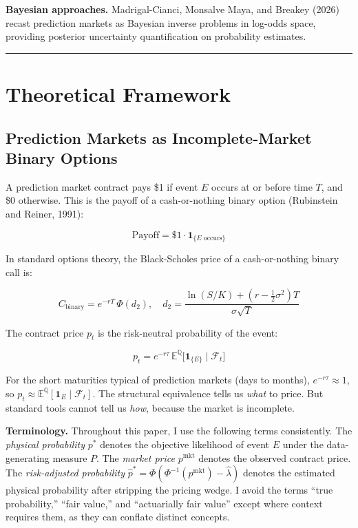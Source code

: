 \documentclass[12pt,a4paper]{article}
\begin{document}
\textbf{Bayesian approaches.} Madrigal-Cianci, Monsalve Maya, and
Breakey (2026) recast prediction markets as Bayesian inverse problems in
log-odds space, providing posterior uncertainty quantification on
probability estimates.

\begin{center}\rule{0.5\linewidth}{0.5pt}\end{center}

\section{Theoretical Framework}\label{theoretical-framework}

\subsection{Prediction Markets as Incomplete-Market Binary
Options}\label{prediction-markets-as-incomplete-market-binary-options}

A prediction market contract pays \$1 if event \(E\) occurs at or before
time \(T\), and \$0 otherwise. This is the payoff of a cash-or-nothing
binary option (Rubinstein and Reiner, 1991):

\[\text{Payoff} = \$1 \cdot \mathbf{1}_{\{E \text{ occurs}\}}\]

In standard options theory, the Black-Scholes price of a cash-or-nothing
binary call is:

\[C_{\text{binary}} = e^{-rT}\,\Phi(d_2), \quad d_2 = \frac{\ln(S/K) + (r - \tfrac{1}{2}\sigma^2)T}{\sigma\sqrt{T}}\]

The contract price \(p_t\) is the risk-neutral probability of the event:

\[p_t = e^{-r\tau}\,\mathbb{E}^{\mathbb{Q}}\!\big[\mathbf{1}_{\{E\}} \mid \mathcal{F}_t\big]\]

For the short maturities typical of prediction markets (days to months),
\(e^{-r\tau} \approx 1\), so
\(p_t \approx \mathbb{E}^{\mathbb{Q}}[\mathbf{1}_E \mid \mathcal{F}_t]\).
The structural equivalence tells us \emph{what} to price. But standard
tools cannot tell us \emph{how}, because the market is incomplete.

\textbf{Terminology.} Throughout this paper, I use the following terms
consistently. The \textit{physical probability} \(p^*\) denotes the
objective likelihood of event \(E\) under the data-generating measure
\(P\). The \textit{market price} \(p^{\text{mkt}}\) denotes the observed
contract price. The \textit{risk-adjusted probability}
\(\hat{p}^* = \Phi(\Phi^{-1}(p^{\text{mkt}}) - \hat{\lambda})\) denotes
the estimated physical probability after stripping the pricing wedge. I
avoid the terms
``true probability,'' ``fair value,'' and ``actuarially fair value''
except where context requires them, as they can conflate distinct concepts.
\end{document}
